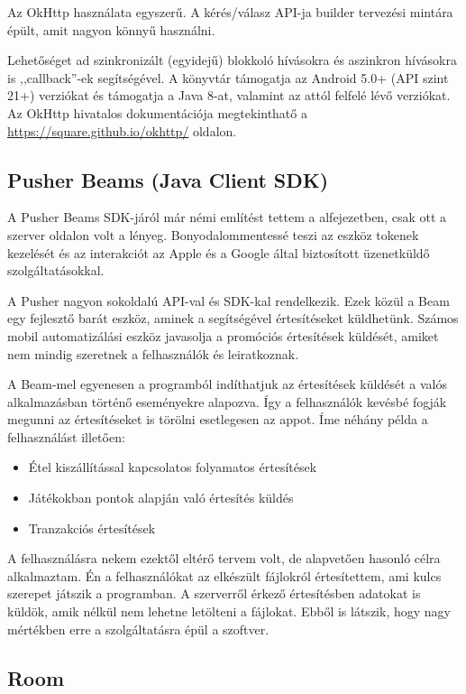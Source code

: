 \documentclass{thesis-ekf}
\theoremstyle{definition}
\theoremstyle{remark}
\begin{document}
Az OkHttp használata egyszerű. A kérés/válasz API-ja builder tervezési mintára épült, amit nagyon könnyű használni.

Lehetőséget ad szinkronizált (egyidejű) blokkoló hívásokra és aszinkron hívásokra is ,,callback''-ek segítségével.
A könyvtár támogatja az Android 5.0+ (API szint 21+) verziókat és támogatja a Java 8-at, valamint az attól felfelé lévő verziókat.
Az OkHttp hivatalos dokumentációja megtekinthatő a \url{https://square.github.io/okhttp/} oldalon.

\subsection{Pusher Beams (Java Client SDK)}

A Pusher Beams SDK-járól már némi említést tettem a  alfejezetben, csak ott a szerver oldalon volt a lényeg.
Bonyodalommentessé teszi az eszköz tokenek kezelését és az interakciót az Apple és a Google által biztosított üzenetküldő szolgáltatásokkal.

A Pusher nagyon sokoldalú API-val és SDK-kal rendelkezik. 
Ezek közül a Beam egy fejlesztő barát eszköz, aminek a segítségével értesítéseket küldhetünk.
Számos mobil automatizálási eszköz javasolja a promóciós értesítések küldését, amiket nem mindig szeretnek a felhasználók és leiratkoznak.

A Beam-mel egyenesen a programból indíthatjuk az értesítések küldését a valós alkalmazásban történő eseményekre alapozva. 
Így a felhasználók kevésbé fogják megunni az értesítéseket is törölni esetlegesen az appot. 
Íme néhány példa a felhasználást illetően:

\begin{itemize}
	\item Étel kiszállítással kapcsolatos folyamatos értesítések
	\item Játékokban pontok alapján való értesítés küldés
	\item Tranzakciós értesítések
\end{itemize}

A felhasználásra nekem ezektől eltérő tervem volt, de alapvetően hasonló célra alkalmaztam.
Én a felhasználókat az elkészült fájlokról értesítettem, ami kulcs szerepet játszik a programban.
A szerverről érkező értesítésben adatokat is küldök, amik nélkül nem lehetne letölteni a fájlokat.
Ebből is látszik, hogy nagy mértékben erre a szolgáltatásra épül a szoftver.

\subsection{Room}
\end{document}
